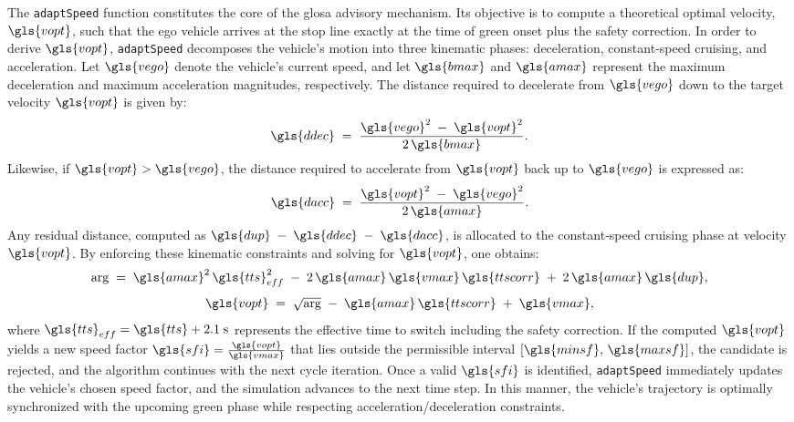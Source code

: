 The \texttt{adaptSpeed} function constitutes the core of the \ac{glosa} advisory mechanism. Its objective is to compute a theoretical optimal velocity, $\gls{vopt}$, such that the ego vehicle arrives at the stop line exactly at the time of green onset plus the safety correction. In order to derive $\gls{vopt}$, \texttt{adaptSpeed} decomposes the vehicle’s motion into three kinematic phases: deceleration, constant‐speed cruising, and acceleration. Let $\gls{vego}$ denote the vehicle’s current speed, and let $\gls{bmax}$ and $\gls{amax}$ represent the maximum deceleration and maximum acceleration magnitudes, respectively. The distance required to decelerate from $\gls{vego}$ down to the target velocity $\gls{vopt}$ is given by:
\begin{equation}
\gls{ddec} \;=\; \frac{\gls{vego}^2 \;-\; \gls{vopt}^2}{2\,\gls{bmax}}.
\end{equation}
Likewise, if $\gls{vopt} > \gls{vego}$, the distance required to accelerate from $\gls{vopt}$ back up to $\gls{vego}$ is expressed as:
\begin{equation}
\gls{dacc} \;=\; \frac{\gls{vopt}^2 \;-\; \gls{vego}^2}{2\,\gls{amax}}.
\end{equation}
Any residual distance, computed as $\gls{dup} \;-\; \gls{ddec} \;-\; \gls{dacc}$, is allocated to the constant‐speed cruising phase at velocity $\gls{vopt}$. By enforcing these kinematic constraints and solving for $\gls{vopt}$, one obtains:
\begin{equation}
    \mathrm{arg} \;=\; \gls{amax}^2\,\gls{tts}_{eff}^2 \;-\; 2\,\gls{amax}\,\gls{vmax}\,\gls{ttscorr} \;+\; 2\,\gls{amax}\,\gls{dup},
\end{equation}
\begin{equation}
\gls{vopt} \;=\; \sqrt{\mathrm{arg}} \;-\; \gls{amax}\,\gls{ttscorr} \;+\; \gls{vmax},
\end{equation}
where $\gls{tts}_{eff} = \gls{tts} + 2.1 \;\text{s}$ represents the effective time to switch including the safety correction. If the computed $\gls{vopt}$ yields a new speed factor $\gls{sfi} = \frac{\gls{vopt}}{\gls{vmax}}$ that lies outside the permissible interval $[\gls{minsf},\,\gls{maxsf}]$, the candidate is rejected, and the algorithm continues with the next cycle iteration. Once a valid $\gls{sfi}$ is identified, \texttt{adaptSpeed} immediately updates the vehicle’s chosen speed factor, and the simulation advances to the next time step. In this manner, the vehicle’s trajectory is optimally synchronized with the upcoming green phase while respecting acceleration/deceleration constraints.

